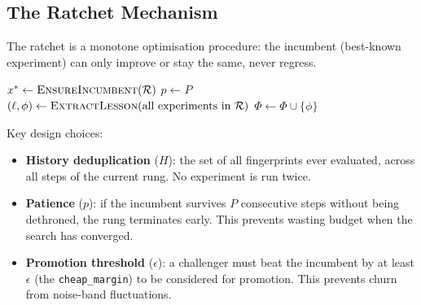 \documentclass[11pt,a4paper]{article}
\newcommand{\code}[1]{\texttt{#1}}
\begin{document}
\subsection{The Ratchet Mechanism}
\label{sec:ratchet}

The ratchet is a monotone optimisation procedure: the incumbent (best-known
experiment) can only improve or stay the same, never regress.

\begin{algorithm}[H]
\SetAlgoLined
{}
$x^* \leftarrow \textsc{EnsureIncumbent}(\mathcal{R})$\;
$p \leftarrow P$\;
$(\ell, \phi) \leftarrow \textsc{ExtractLesson}(\text{all experiments in } \mathcal{R})$\;
$\Phi \leftarrow \Phi \cup \{\phi\}$\;
\;
\caption{Run-Rung: a complete search campaign}
\label{alg:rung}
\end{algorithm}

Key design choices:

\begin{itemize}
  \item \textbf{History deduplication} ($H$): the set of all fingerprints ever
    evaluated, across all steps of the current rung. No experiment is run
    twice.
  \item \textbf{Patience} ($p$): if the incumbent survives $P$ consecutive
    steps without being dethroned, the rung terminates early. This prevents
    wasting budget when the search has converged.
  \item \textbf{Promotion threshold} ($\epsilon$): a challenger must beat the
    incumbent by at least $\epsilon$ (the \code{cheap\_margin}) to be
    considered for promotion. This prevents churn from noise-band fluctuations.
\end{itemize}
\end{document}
